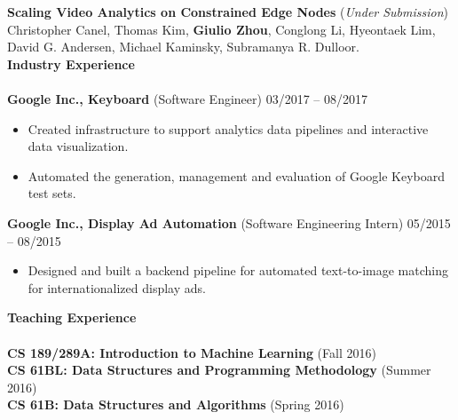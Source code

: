 \documentclass{article}
\begin{document}
\noindent
\textbf{Scaling Video Analytics on Constrained Edge Nodes} (\textit{Under Submission}) \\
Christopher Canel, Thomas Kim, \textbf{Giulio Zhou}, Conglong Li, Hyeontaek Lim, David G. Andersen, Michael Kaminsky, Subramanya R. Dulloor. \\

\noindent
\textbf{{\Large Industry Experience}}\\[-2mm]
\HRule\\
\textbf{Google Inc., Keyboard} (Software Engineer)
\hfill 03/2017 -- 08/2017\\
\begin{itemize}
\vspace{-6.5mm}
\item Created infrastructure to support analytics data pipelines and interactive data visualization.
\vspace{-2.5mm}
\item Automated the generation, management and evaluation of Google Keyboard test sets.
\end{itemize}
\vspace{-2mm}

\noindent
\textbf{Google Inc., Display Ad Automation} (Software Engineering Intern)
\hfill 05/2015 -- 08/2015\\
\begin{itemize}
\vspace{-6.5mm}
\item Designed and built a backend pipeline for automated text-to-image matching for internationalized display ads.
\end{itemize}
\vspace{1mm}

\noindent
\textbf{{\Large Teaching Experience}}\\[-2mm]
\HRule\\
\hspace*{1.2mm}\textbf{CS 189/289A: Introduction to Machine Learning} (Fall 2016) \\
\vspace{0.5mm}
\textbf{CS 61BL: Data Structures and Programming Methodology} (Summer 2016) \\
\vspace{0.5mm}
\textbf{CS 61B: Data Structures and Algorithms} (Spring 2016)
\vspace{2.0mm}
\end{document}
